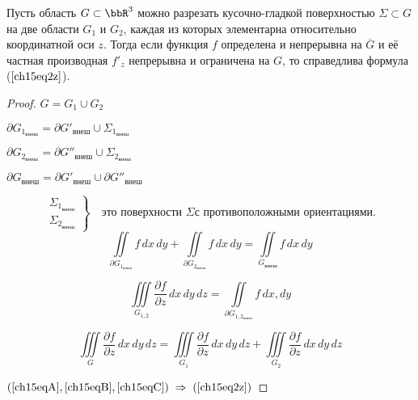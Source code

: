 \begin{lemm}
Пусть область $G \subset \bbR^3$ можно разрезать кусочно-гладкой поверхностью $\Sigma \subset G$ на две области $G_1$ и $G_2$, каждая из которых элементарна относительно координатной оси $z$. Тогда если функция $f$ определена и непрерывна на $\overline{G}$ и её частная производная $f'_z$ непрерывна и ограничена на $G$, то справедлива формула ($\ref{ch15eq2z}$).
\end{lemm}

\begin{proof}
$G = G_1 \cup G_2$

$\partial G_{1_{\textit{внеш}}} = \partial G'_{\textit{внеш}} \cup \Sigma_{1_{\textit{внеш}}}$

$\partial G_{2_{\textit{внеш}}} = \partial G''_{\textit{внеш}} \cup \Sigma_{2_{\textit{внеш}}}$

$\partial G_{\textit{внеш}} = \partial G'_{\textit{внеш}} \cup \partial G''_{\textit{внеш}}$

\begin{equation*}
\left.\begin{aligned}
\Sigma_{1_{\textit{внеш}}} \\ 
 \Sigma_{2_{\textit{внеш}}}
\end{aligned} \right\} \quad  \textit{это поверхности } \Sigma \textit{с противоположными ориентациями}.
\end{equation*}
\begin{equation} \label{ch15eqA}
\iint\limits_{\partial G_{1_{\textit{внеш}}}} f \,dx\,dy + \iint\limits_{\partial G_{2_{\textit{внеш}}}} f \,dx\,dy = \iint\limits_{G_{\textit{внеш}}} f\,dx\,dy
\end{equation}

\begin{equation} \label{ch15eqB}
\iiint\limits_{G_{1,2}} \frac{\partial f}{\partial z}\,dx\,dy\,dz = \iint\limits_{\partial G_{1,2_{\textit{внеш}}}} f \,dx,dy
\end{equation}

\begin{equation} \label{ch15eqC}
\iiint\limits_{G} \frac{\partial f}{\partial z}\,dx\,dy\,dz = \iiint\limits_{G_1} \frac{\partial f}{\partial z}\,dx\,dy\,dz + \iiint\limits_{G_2} \frac{\partial f}{\partial z}\,dx\,dy\,dz 
\end{equation}

$(\ref{ch15eqA}, \ref{ch15eqB}, \ref{ch15eqC}) \; \Rightarrow \; (\ref{ch15eq2z})$
\end{proof}

